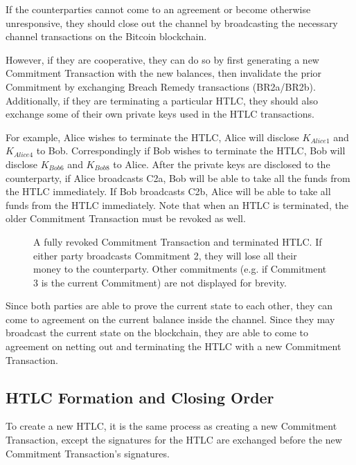 \documentclass[letterpaper,11pt]{article}
\begin{document}
If the counterparties cannot come to an agreement or become otherwise
unresponsive, they should close out the channel by broadcasting the necessary
channel transactions on the Bitcoin blockchain.

However, if they are cooperative, they can do so by first generating a new
Commitment Transaction with the new balances, then invalidate the prior
Commitment by exchanging Breach Remedy transactions (BR2a/BR2b). Additionally,
if they are terminating a particular HTLC, they should also exchange some of
their own private keys used in the HTLC transactions. 

For example, Alice wishes to terminate the HTLC, Alice will disclose
$K_{Alice1}$ and $K_{Alice4}$ to Bob. Correspondingly if Bob wishes to terminate
the HTLC, Bob will disclose $K_{Bob6}$ and $K_{Bob8}$ to Alice. After the
private keys are disclosed to the counterparty, if Alice broadcasts C2a, Bob
will be able to take all the funds from the HTLC immediately. If Bob broadcasts
C2b, Alice will be able to take all funds from the HTLC immediately. Note that
when an HTLC is terminated, the older Commitment Transaction must be revoked as
well.

\begin{figure}[H]
	\vspace*{-3cm}
	\caption{A fully revoked Commitment Transaction and terminated
		HTLC. If either party broadcasts Commitment 2, they will lose
		all their money to the counterparty. Other commitments (e.g. if
		Commitment 3 is the current Commitment) are not displayed for
		brevity.
	}
\end{figure}

Since both parties are able to prove the current state to each other, they can
come to agreement on the current balance inside the channel. Since they may
broadcast the current state on the blockchain, they are able to come to
agreement on netting out and terminating the HTLC with a new Commitment
Transaction.

\subsection{HTLC Formation and Closing Order}

To create a new HTLC, it is the same process as creating a new Commitment
Transaction, except the signatures for the HTLC are exchanged before the new
Commitment Transaction's signatures.
\end{document}
